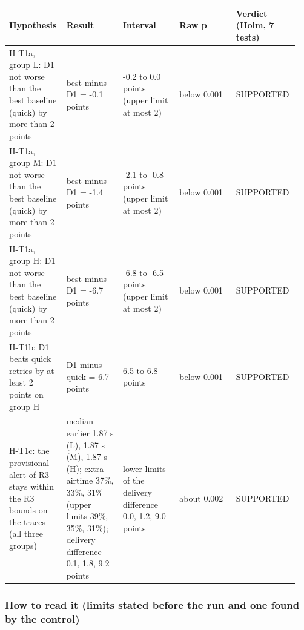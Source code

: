{\scriptsize\raggedright
\begin{longtable}{p{0.190\linewidth}p{0.190\linewidth}p{0.190\linewidth}p{0.190\linewidth}p{0.190\linewidth}}
\toprule
Hypothesis & Result & Interval & Raw p & Verdict (Holm, 7 tests) \\
\midrule
\endhead
H-T1a, group L: D1 not worse than the best baseline (quick) by more than 2 points & best minus D1 = -0.1 points & -0.2 to 0.0 points (upper limit at most 2) & below 0.001 & SUPPORTED \\
H-T1a, group M: D1 not worse than the best baseline (quick) by more than 2 points & best minus D1 = -1.4 points & -2.1 to -0.8 points (upper limit at most 2) & below 0.001 & SUPPORTED \\
H-T1a, group H: D1 not worse than the best baseline (quick) by more than 2 points & best minus D1 = -6.7 points & -6.8 to -6.5 points (upper limit at most 2) & below 0.001 & SUPPORTED \\
H-T1b: D1 beats quick retries by at least 2 points on group H & D1 minus quick = 6.7 points & 6.5 to 6.8 points & below 0.001 & SUPPORTED \\
H-T1c: the provisional alert of R3 stays within the R3 bounds on the traces (all three groups) & median earlier 1.87 s (L), 1.87 s (M), 1.87 s (H); extra airtime 37\%, 33\%, 31\% (upper limits 39\%, 35\%, 31\%); delivery difference 0.1, 1.8, 9.2 points & lower limits of the delivery difference 0.0, 1.2, 9.0 points & about 0.002 & SUPPORTED \\
\bottomrule
\end{longtable}}

\subsubsection*{How to read it (limits stated before the run and one found by the control)}

